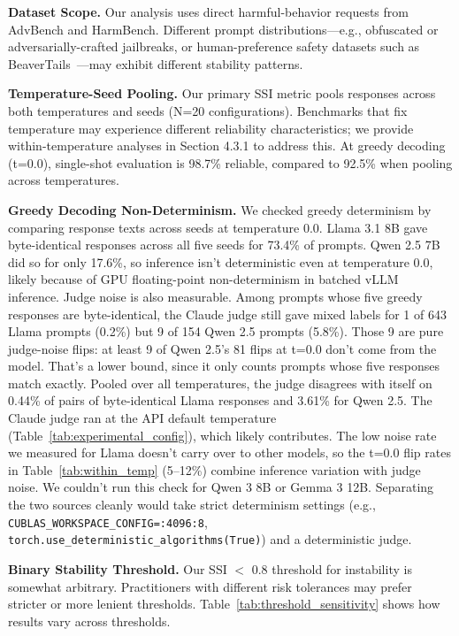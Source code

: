 \documentclass[11pt]{article}
\begin{document}
\textbf{Dataset Scope.} Our analysis uses direct harmful-behavior requests from AdvBench and HarmBench. Different prompt distributions---e.g., obfuscated or adversarially-crafted jailbreaks, or human-preference safety datasets such as BeaverTails~\cite{ji2023beavertails}---may exhibit different stability patterns.

\textbf{Temperature-Seed Pooling.} Our primary SSI metric pools responses across both temperatures and seeds (N=20 configurations). Benchmarks that fix temperature may experience different reliability characteristics; we provide within-temperature analyses in Section 4.3.1 to address this. At greedy decoding (t=0.0), single-shot evaluation is 98.7\% reliable, compared to 92.5\% when pooling across temperatures.

\textbf{Greedy Decoding Non-Determinism.} We checked greedy determinism by comparing response texts across seeds at temperature 0.0. Llama 3.1 8B gave byte-identical responses across all five seeds for 73.4\% of prompts. Qwen 2.5 7B did so for only 17.6\%, so inference isn't deterministic even at temperature 0.0, likely because of GPU floating-point non-determinism in batched vLLM inference. Judge noise is also measurable. Among prompts whose five greedy responses are byte-identical, the Claude judge still gave mixed labels for 1 of 643 Llama prompts (0.2\%) but 9 of 154 Qwen 2.5 prompts (5.8\%). Those 9 are pure judge-noise flips: at least 9 of Qwen 2.5's 81 flips at t=0.0 don't come from the model. That's a lower bound, since it only counts prompts whose five responses match exactly. Pooled over all temperatures, the judge disagrees with itself on 0.44\% of pairs of byte-identical Llama responses and 3.61\% for Qwen 2.5. The Claude judge ran at the API default temperature (Table~\ref{tab:experimental_config}), which likely contributes. The low noise rate we measured for Llama doesn't carry over to other models, so the t=0.0 flip rates in Table~\ref{tab:within_temp} (5--12\%) combine inference variation with judge noise. We couldn't run this check for Qwen 3 8B or Gemma 3 12B. Separating the two sources cleanly would take strict determinism settings (e.g., \texttt{CUBLAS\_WORKSPACE\_CONFIG=:4096:8}, \texttt{torch.use\_deterministic\_algorithms(True)}) and a deterministic judge.

\textbf{Binary Stability Threshold.} Our SSI $<$ 0.8 threshold for instability is somewhat arbitrary. Practitioners with different risk tolerances may prefer stricter or more lenient thresholds. Table~\ref{tab:threshold_sensitivity} shows how results vary across thresholds.
\end{document}
